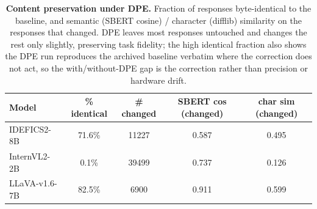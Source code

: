 \begin{table}[t]\centering\small
\caption{\textbf{Content preservation under DPE.} Fraction of responses byte-identical to the baseline, and semantic (SBERT cosine) / character (difflib) similarity on the responses that changed. DPE leaves most responses untouched and changes the rest only slightly, preserving task fidelity; the high identical fraction also shows the DPE run reproduces the archived baseline verbatim where the correction does not act, so the with/without-DPE gap is the correction rather than precision or hardware drift.}
\label{tab:dpe_content}
\begin{tabular}{lcccc}
\toprule
Model & \% identical & \# changed & SBERT cos (changed) & char sim (changed) \\
\midrule
IDEFICS2-8B & 71.6\% & 11227 & 0.587 & 0.495 \\
InternVL2-2B & 0.1\% & 39499 & 0.737 & 0.126 \\
LLaVA-v1.6-7B & 82.5\% & 6900 & 0.911 & 0.599 \\
\bottomrule
\end{tabular}
\end{table}

